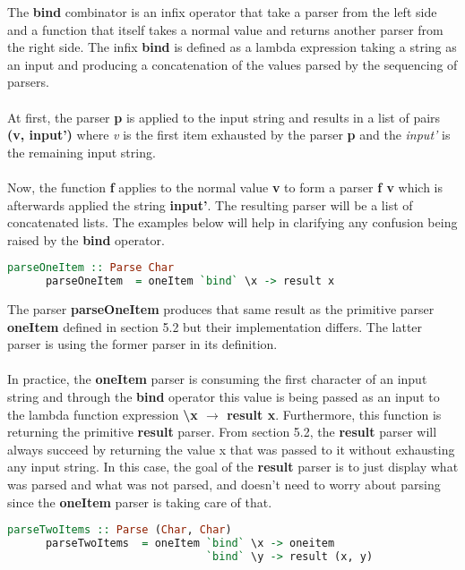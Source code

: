 \documentclass[a4paper, onecolumn]{article}
\begin{document}
    The \textbf{bind} combinator is an infix operator that take a parser from the left side and a function that itself takes a normal value and returns another parser from the right side. The infix \textbf{bind} is defined as a lambda expression taking a string as an input and producing a concatenation of the values parsed by the sequencing of parsers. \\ \\
    At first, the parser \textbf{p} is applied to the input string and results in a list of pairs \textbf{(v, input')} where \textit{v} is the first item exhausted by the parser \textbf{p} and the \textit{input'} is the remaining input string. \\ \\
    Now, the function \textbf{f} applies to the normal value \textbf{v} to form a parser \textbf{f v} which is afterwards applied the string \textbf{input'}. The resulting parser will be a list of concatenated lists. The examples below will help in clarifying any confusion being raised by the \textbf{bind} operator. 
    
    \begin{tcolorbox}
    \begin{lstlisting}[language=Haskell]
      parseOneItem :: Parse Char
      parseOneItem  = oneItem `bind` \x -> result x 
    \end{lstlisting}
    \end{tcolorbox}
    
    The parser \textbf{parseOneItem} produces that same result as the primitive parser \textbf{oneItem} defined in section 5.2 but their implementation differs. The latter parser is using the former parser in its definition. \\ \\ 
    In practice, the \textbf{oneItem} parser is consuming the first character of an input string and through the \textbf{bind} operator this value is being passed as an input to the lambda function expression \textbf{\textbackslash x $\rightarrow$ result x}. Furthermore, this function is returning the primitive \textbf{result} parser. From section 5.2, the \textbf{result} parser will always succeed by returning the value x that was passed to it without exhausting any input string. In this case, the goal of the \textbf{result} parser is to just display what was parsed and what was not parsed, and doesn't need to worry about parsing since the \textbf{oneItem} parser is taking care of that.  
    
    \begin{tcolorbox}
    \begin{lstlisting}[language=Haskell]
      parseTwoItems :: Parse (Char, Char)
      parseTwoItems  = oneItem `bind` \x -> oneitem 
                               `bind` \y -> result (x, y)
    \end{lstlisting}
    \end{tcolorbox}
    
\end{document}
